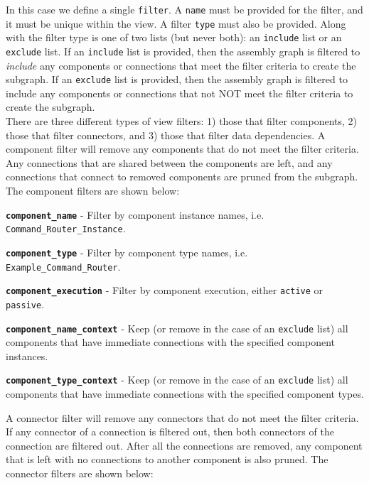 In this case we define a single \texttt{filter}. A \texttt{name} must be provided for the filter, and it must be unique within the view. A filter \texttt{type} must also be provided. Along with the filter type is one of two lists (but never both): an \texttt{include} list or an \texttt{exclude} list. If an \texttt{include} list is provided, then the assembly graph is filtered to \textit{include} any components or connections that meet the filter criteria to create the subgraph. If an \texttt{exclude} list is provided, then the assembly graph is filtered to include any components or connections that not NOT meet the filter criteria to create the subgraph. \\

There are three different types of view filters: 1) those that filter components, 2) those that filter connectors, and 3) those that filter data dependencies. A component filter will remove any components that do not meet the filter criteria. Any connections that are shared between the components are left, and any connections that connect to removed components are pruned from the subgraph. The component filters are shown below:

\vspace{5mm} %
\begin{spaceditemize}
  \item \textbf{\texttt{component\_name}} - Filter by component instance names, i.e. \texttt{Command\_Router\_Instance}.
  \item \textbf{\texttt{component\_type}} - Filter by component type names, i.e. \texttt{Example\_Command\_Router}.
  \item \textbf{\texttt{component\_execution}} - Filter by component execution, either \texttt{active} or \texttt{passive}.
  \item \textbf{\texttt{component\_name\_context}} - Keep (or remove in the case of an \texttt{exclude} list) all components that have immediate connections with the specified component instances.
  \item \textbf{\texttt{component\_type\_context}} - Keep (or remove in the case of an \texttt{exclude} list) all components that have immediate connections with the specified component types.
\end{spaceditemize}
\vspace{5mm} %

A connector filter will remove any connectors that do not meet the filter criteria. If any connector of a connection is filtered out, then both connectors of the connection are filtered out. After all the connections are removed, any component that is left with no connections to another component is also pruned. The connector filters are shown below:

